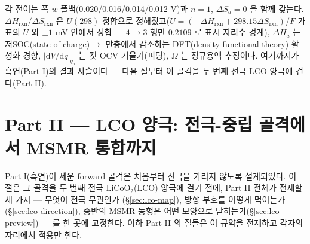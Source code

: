 \documentclass[11pt,a4paper]{article}
\newcommand{\dd}{\mathrm{d}}
\newcommand{\rxn}{\mathrm{rxn}}
\begin{document}
각 전이는 폭 $w$ 폴백(0.020/0.016/0.014/0.012 V)과 $n=1$, $\Delta S_a=0$ 을 함께 갖는다. $\Delta H_\rxn/\Delta S_\rxn$
은 $U(298)$ 정합으로 정해졌고($U=(-\Delta H_\rxn+298.15\Delta S_\rxn)/F$ 가 표의 $U$ 와 $\pm1$ mV 안에서 정합 — $4\!\to\!3$ 행만 $0.2109$ 로 표시 자리수 경계), $\Delta H_a$ 는 저SOC(state of charge)$\to$
만충에서 감소하는 DFT(density functional theory) 활성화 경향, $|\dd V/\dd q|_{q_a}$ 는 컷 OCV 기울기(피팅), $\Omega$ 는 정규용액 추정이다.
여기까지가 흑연(Part I)의 결과 사슬이다 — 다음 절부터 이 골격을 두 번째 전극 LCO 양극에 건다(Part II).

\section{Part II --- LCO 양극: 전극-중립 골격에서 MSMR 통합까지}\label{sec:lco-intro}
Part I(흑연)이 세운 forward 골격은 처음부터 전극을 가리지 않도록 설계되었다. 이 절은 그 골격을 두 번째 전극
$\mathrm{LiCoO_2}$(LCO) 양극에 걸기 전에, Part II 전체가 전제할 세 가지 --- 무엇이 전극 무관인가
(\S\ref{sec:lco-map}), 방향 부호를 어떻게 먹이는가(\S\ref{sec:lco-direction}), 종반의 MSMR 동형은 어떤
모양으로 닫히는가(\S\ref{sec:lco-preview}) --- 를 한 곳에 고정한다. 이하 Part II 의 절들은 이 규약을
전제하고 각자의 자리에서 적용만 한다.
\end{document}
